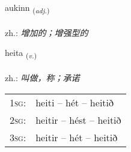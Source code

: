 \documentclass[frontgrid, backgrid]{flacards}\usepackage[]{graphicx}\usepackage[]{xcolor}
\begin{document}
\renewcommand{\blhead}{\vskip5pt {\small\bfseries\footnotesize Lýsingarorð | 形容词 }}
\renewcommand{\bcfoot}{\vskip5pt \hspace{2pt}{\small\bfseries\footnotesize 1K}}


{aukinn \small{\textsubscript{(\textit{adj.})}} \\[1ex] %
\textphonetic{[œiːcɪn]} \\
zh.: \emph{增加的；增强型的} \\  [2ex]
\renewcommand*{\arraystretch}{0.8}
}

\renewcommand{\flhead}{\vskip5pt \fboxsep=0pt {\small\bfseries\footnotesize Sagnorð | 动词}}
\renewcommand{\fcfoot}{\vskip5pt \fboxsep=0pt \hspace{2pt}{\small\bfseries\footnotesize 1K}}

\renewcommand{\blhead}{\vskip5pt {\small\bfseries\footnotesize Sagnorð | 动词 }}
\renewcommand{\bcfoot}{\vskip5pt \hspace{2pt}{\small\bfseries\footnotesize 1K}}


{heita \small{\textsubscript{(\textit{v.})}} \\[1ex] %
\textphonetic{[heiːta]} \\
zh.: \emph{叫做，称；承诺} \\  [2ex]
\renewcommand*{\arraystretch}{0.8}
\begin{tabular}{p{1cm}l}
\textsc{1sg}: & heiti -- hét -- heitið \\ 
\textsc{2sg}: & heitir -- hést -- heitið \\ 
\textsc{3sg}: & heitir -- hét -- heitið \\ 
\end{tabular}
}
\end{document}
